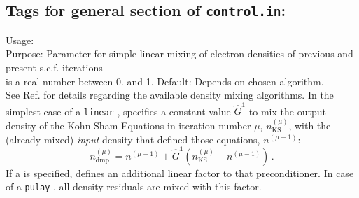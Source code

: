 \newpage

\subsection*{Tags for general section of \texttt{control.in}:}

{
  \noindent
  Usage:   \\[1.0ex]
  Purpose: Parameter for simple linear mixing of electron densities of 
    previous and present s.c.f. iterations \\[1.0ex]
   is a real number between 0. and 1. Default: Depends
    on chosen  algorithm. \\
}
See Ref. \cite{Blum08} for details regarding the available density
mixing algorithms. In the simplest case of a \texttt{linear}
,  specifies a constant value $\hat{G}^1$
to mix the output density of the Kohn-Sham Equations in iteration
number $\mu$, $n_\text{KS}^{(\mu)}$, with the (already mixed)
\emph{input} density that defined those equations, $n^{(\mu-1)}$:  
\begin{equation}\label{Eq:dmp}
  n^{(\mu)}_\text{dmp} = n^{(\mu-1)} + \hat{G}^1
  (n_\text{KS}^{(\mu)}- n^{(\mu-1)}) \, .
\end{equation}
If a  is specified,
 defines an additional linear factor to
that preconditioner. In case of a \texttt{pulay} , all
density residuals are mixed with this factor.

